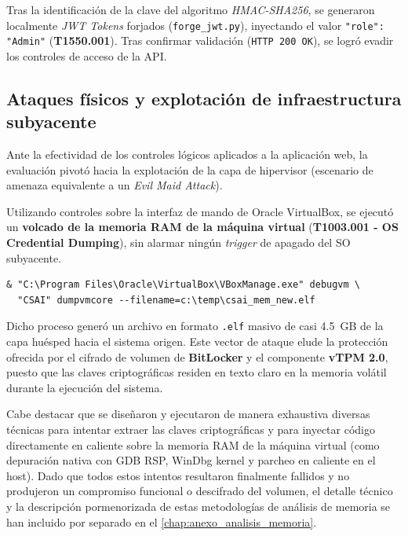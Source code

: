 Tras la identificación de la clave del algoritmo \textit{HMAC-SHA256}, se generaron localmente \textit{JWT Tokens} forjados (\texttt{forge\_jwt.py}), inyectando el valor \texttt{"role": "Admin"} (\textbf{T1550.001}). Tras confirmar validación (\texttt{HTTP 200 OK}), se logró evadir los controles de acceso de la API.

\subsection[Ataques Físicos e Infraestructura]{Ataques físicos y explotación de infraestructura subyacente}
\label{subsec:ataques_fisicos}
Ante la efectividad de los controles lógicos aplicados a la aplicación web, la evaluación pivotó hacia la explotación de la capa de hipervisor (escenario de amenaza equivalente a un \textit{Evil Maid Attack}).

Utilizando controles sobre la interfaz de mando de Oracle VirtualBox, se ejecutó un \textbf{volcado de la memoria RAM de la máquina virtual} (\textbf{T1003.001 - OS Credential Dumping}), sin alarmar ningún \textit{trigger} de apagado del SO subyacente.
\begin{lstlisting}
& "C:\Program Files\Oracle\VirtualBox\VBoxManage.exe" debugvm \
  "CSAI" dumpvmcore --filename=c:\temp\csai_mem_new.elf
\end{lstlisting}
Dicho proceso generó un archivo en formato \texttt{.elf} masivo de casi 4.5~GB de la capa huésped hacia el sistema origen. Este vector de ataque elude la protección ofrecida por el cifrado de volumen de \textbf{BitLocker} y el componente \textbf{vTPM 2.0}, puesto que las claves criptográficas residen en texto claro en la memoria volátil durante la ejecución del sistema.

Cabe destacar que se diseñaron y ejecutaron de manera exhaustiva diversas técnicas para intentar extraer las claves criptográficas y para inyectar código directamente en caliente sobre la memoria RAM de la máquina virtual (como depuración nativa con GDB RSP, WinDbg kernel y parcheo en caliente en el host). Dado que todos estos intentos resultaron finalmente fallidos y no produjeron un compromiso funcional o descifrado del volumen, el detalle técnico y la descripción pormenorizada de estas metodologías de análisis de memoria se han incluido por separado en el \ref{chap:anexo_analisis_memoria}.


